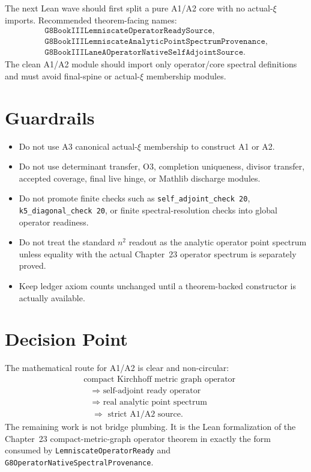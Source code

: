 \documentclass[11pt]{article}
\begin{document}
The next Lean wave should first split a pure A1/A2 core with no actual-\(\xi\)
imports.  Recommended theorem-facing names:
\[
\begin{gathered}
  \texttt{G8BookIIILemniscateOperatorReadySource},\\
  \texttt{G8BookIIILemniscateAnalyticPointSpectrumProvenance},\\
  \texttt{G8BookIIILaneAOperatorNativeSelfAdjointSource}.
\end{gathered}
\]
The clean A1/A2 module should import only operator/core spectral definitions
and must avoid final-spine or actual-\(\xi\) membership modules.

\section*{Guardrails}

\begin{itemize}
\item Do not use A3 canonical actual-\(\xi\) membership to construct A1 or A2.
\item Do not use determinant transfer, O3, completion uniqueness, divisor
  transfer, accepted coverage, final live hinge, or Mathlib discharge modules.
\item Do not promote finite checks such as \texttt{self\_adjoint\_check 20},
  \texttt{k5\_diagonal\_check 20}, or finite spectral-resolution checks into global
  operator readiness.
\item Do not treat the standard \(n^2\) readout as the analytic operator point
  spectrum unless equality with the actual Chapter~23 operator spectrum is
  separately proved.
\item Keep ledger axiom counts unchanged until a theorem-backed constructor is
  actually available.
\end{itemize}

\section*{Decision Point}

The mathematical route for A1/A2 is clear and non-circular:
\[
\begin{aligned}
&\text{compact Kirchhoff metric graph operator}\\
&\quad\Rightarrow\text{ self-adjoint ready operator}\\
&\quad\Rightarrow\text{ real analytic point spectrum}\\
&\quad\Rightarrow\text{ strict A1/A2 source}.
\end{aligned}
\]
The remaining work is not bridge plumbing.  It is the Lean formalization of the
Chapter~23 compact-metric-graph operator theorem in exactly the form consumed
by \texttt{LemniscateOperatorReady} and
\texttt{G8OperatorNativeSpectralProvenance}.
\end{document}
